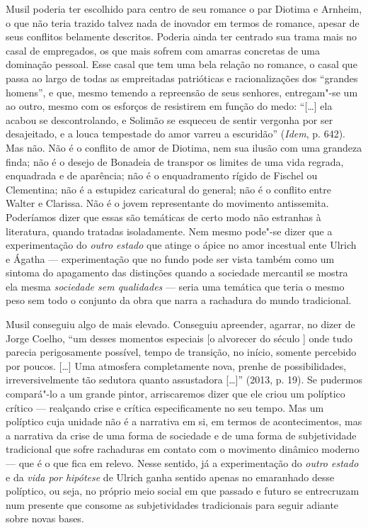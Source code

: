 Musil poderia ter escolhido para centro de seu romance o par Diotima e
Arnheim, o que não teria trazido talvez nada de inovador em termos de
romance, apesar de seus conflitos belamente descritos. Poderia ainda ter
centrado sua trama mais no casal de empregados, os que mais sofrem com
amarras concretas de uma dominação pessoal. Esse casal que tem uma bela
relação no romance, o casal que passa ao largo de todas as empreitadas
patrióticas e racionalizações dos ``grandes homens'', e que, mesmo
temendo a repreensão de seus senhores, entregam"-se um ao outro, mesmo
com os esforços de resistirem em função do medo: ``[\ldots{}] ela acabou
se descontrolando, e Solimão se esqueceu de sentir vergonha por ser
desajeitado, e a louca tempestade do amor varreu a escuridão''
(\emph{Idem}, p. 642). Mas não. Não é o conflito de amor de Diotima, nem
sua ilusão com uma grandeza finda; não é o desejo de Bonadeia de
transpor os limites de uma vida regrada, enquadrada e de aparência; não
é o enquadramento rígido de Fischel ou Clementina; não é a estupidez
caricatural do general; não é o conflito entre Walter e Clarissa. Não é
o jovem representante do movimento antissemita. Poderíamos dizer que
essas são temáticas de certo modo não estranhas à literatura, quando
tratadas isoladamente. Nem mesmo pode"-se dizer que a experimentação do
\emph{outro estado} que atinge o ápice no amor incestual ente Ulrich e
Ágatha --- experimentação que no fundo pode ser vista também como um
sintoma do apagamento das distinções quando a sociedade mercantil se
mostra ela mesma \emph{sociedade sem qualidades} --- seria uma temática
que teria o mesmo peso sem todo o conjunto da obra que narra a rachadura
do mundo tradicional.

Musil conseguiu algo de mais elevado. Conseguiu apreender, agarrar, no
dizer de Jorge Coelho, ``um desses momentos especiais [o alvorecer do
século ] onde tudo parecia perigosamente possível, tempo de
transição, no início, somente percebido por poucos. [\ldots{}] Uma
atmosfera completamente nova, prenhe de possibilidades,
irreversivelmente tão sedutora quanto assustadora [\ldots{}]'' (2013, p.
19). Se pudermos compará"-lo a um grande pintor, arriscaremos dizer que
ele criou um políptico crítico --- realçando crise e crítica
especificamente no seu tempo. Mas um políptico cuja unidade não é a
narrativa em si, em termos de acontecimentos, mas a narrativa da crise
de uma forma de sociedade e de uma forma de subjetividade tradicional
que sofre rachaduras em contato com o movimento dinâmico moderno --- que
é o que fica em relevo. Nesse sentido, já a experimentação do
\emph{outro estado} e da \emph{vida por hipótese} de Ulrich ganha
sentido apenas no emaranhado desse políptico, ou seja, no próprio meio
social em que passado e futuro se entrecruzam num presente que consome
as subjetividades tradicionais para seguir adiante sobre novas bases.

